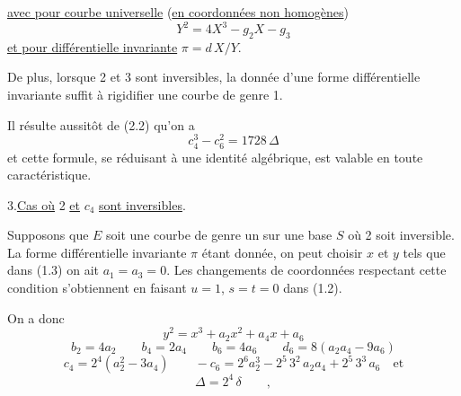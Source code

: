 \uline{avec pour courbe universelle} (\uline{en coordonnées non homogènes}) 
\[
Y^2=4X^3-g_2X-g_3
\]
\uline{et pour différentielle invariante} $\pi=d\,X/Y$.

De plus, lorsque 2 et 3 sont inversibles, la donnée d'une forme différentielle invariante suffit à rigidifier une courbe de genre 1.

Il résulte aussitôt de (2.2) qu'on a
\[
c_4^3-c_6^2=1728\,\Delta\tag*{(2.6)}
\]
et cette formule, se réduisant à une identité algébrique, est valable en toute caractéristique.

3.\qquad \uline{Cas où} 2 \uline{et} $c_4$ \uline{sont inversibles}.

Supposons que $E$ soit une courbe de genre un sur une base $S$ où 2 soit inversible. La forme différentielle invariante $\pi$ étant donnée, on peut choisir $x$ et $y$ tels que dans (1.3) on ait $a_1=a_3=0$. Les changements de coordonnées respectant cette condition s'obtiennent en faisant $u=1$, $s=t=0$ dans (1.2).

On a donc
\[
y^2=x^3+a_2x^2+a_4x+a_6\tag*{(3.1)}
\]
\[
b_2=4a_2\qquad b_4=2a_4\qquad b_6=4a_6\qquad d_6=8(a_2a_4-9a_6)
\]
\[
c_4=2^4(a_2^2-3a_4)\qquad -c_6=2^6a_2^3-2^5\,3^2\,a_2a_4+2^5\,3^3\,a_6\quad\text{et}\tag*{(3.2)}
\]
\[
\Delta=2^4\,\delta \qquad ,
\]

